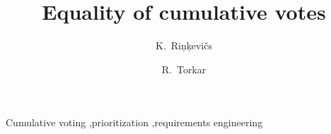 \begin{frontmatter}
\title{Equality of cumulative votes}


\author[aff1]{K.~Ri{\c n}{\c k}evi{\v c}s}
\author[aff1,aff2]{R.~Torkar}
\address[aff1]{Blekinge Institute of Technology, Sweden}
\address[aff2]{Simula Research Laboratory, Norway}


\begin{abstract}

\end{abstract}

\begin{keyword}
Cumulative voting \sep prioritization \sep requirements engineering
\end{keyword}

\end{frontmatter}
